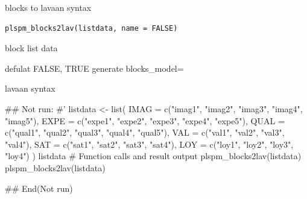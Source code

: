 \documentclass[a4paper]{book}
\begin{document}
%
\begin{Description}
blocks to lavaan syntax
\end{Description}
%
\begin{Usage}
\begin{verbatim}
plspm_blocks2lav(listdata, name = FALSE)
\end{verbatim}
\end{Usage}
%
\begin{Arguments}
\begin{ldescription}
\item[\code{listdata}] block list data

\item[\code{name}] defulat FALSE, TRUE generate blocks\_model=
\end{ldescription}
\end{Arguments}
%
\begin{Value}
lavaan syntax
\end{Value}
%
\begin{Examples}
\begin{ExampleCode}

\#\# Not run: 
#'
listdata <- list(
  IMAG = c("imag1", "imag2", "imag3", "imag4", "imag5"),
  EXPE = c("expe1", "expe2", "expe3", "expe4", "expe5"),
  QUAL = c("qual1", "qual2", "qual3", "qual4", "qual5"),
  VAL = c("val1", "val2", "val3", "val4"),
  SAT = c("sat1", "sat2", "sat3", "sat4"),
  LOY = c("loy1", "loy2", "loy3", "loy4")
)
listdata
# Function calls and result output
plspm_blocks2lav(listdata)
plspm_blocks2lav(listdata)%

## End(Not run)

\end{ExampleCode}
\end{Examples}
\end{document}
